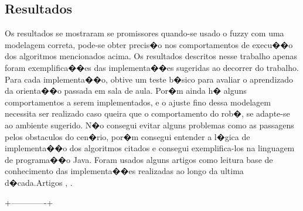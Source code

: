 \documentclass[twoside,conference,a4paper]{IEEEtran}
\begin{document}
\subsection{Resultados}

Os resultados se mostraram se promissores quando-se usado o fuzzy com uma modelagem correta, pode-se obter precis�o nos comportamentos de execu��o dos algoritmos mencionados acima. Os resultados descritos nesse trabalho apenas foram exemplifica��es das implementa��es sugeridas ao decorrer do trabalho. Para cada implementa��o, obtive um teste b�sico para avaliar o aprendizado da orienta��o passada em sala de aula.
Por�m ainda h� alguns comportamentos a serem implementados, e o ajuste fino dessa modelagem necessita ser realizado caso queira que o comportamento do rob�, se adapte-se ao ambiente sugerido.
N�o consegui evitar alguns problemas como as passagens pelos obstaculos do cen�rio, por�m consegui entender a l�gica de implementa��o dos algoritmos citados e consegui exemplifica-los na linguagem de programa��o Java.
Foram usados alguns artigos como leitura base de conhecimento das implementa��es realizadas ao longo da ultima d�cada.Artigos \cite{Omrane:2016}, \cite{Beom:1995}.





 +-------------+






\end{document}
